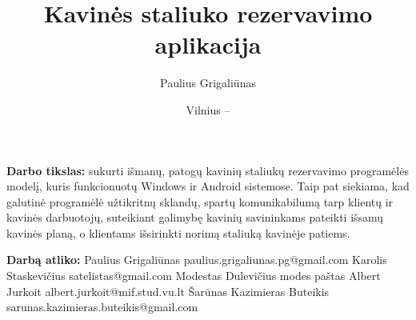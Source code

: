 \documentclass{VUMIFPSkursinis}
\title{Kavinės staliuko rezervavimo aplikacija}
\author{Paulius Grigaliūnas}
\date{Vilnius – \the\year}
\begin{document}
	
\maketitle
\cleardoublepage{}
\setcounter{page}{2}



{\bfseries Darbo tikslas:} sukurti išmanų, patogų kavinių staliukų rezervavimo programėlės modelį, kuris funkcionuotų Windows ir Android sistemose. Taip pat siekiama, kad galutinė programėlė užtikritnų sklandų, spartų komunikabilumą tarp klientų ir kavinės darbuotojų, suteikiant galimybę kavinių savininkams pateikti išsamų kavinės planą, o klientams išsirinkti norimą staliuką kavinėje patiems. 
\newline
\newline
\newline


{\bfseries Darbą atliko:}
\newline
\newline
\newline
Paulius Grigaliūnas
\newline
paulius.grigaliunas.pg@gmail.com
\newline
\newline
\newline
Karolis Staskevičius
\newline
satelistas@gmail.com
\newline
\newline
\newline
Modestas Dulevičius
\newline
modes paštas
\newline
\newline
\newline
Albert Jurkoit
\newline
albert.jurkoit@mif.stud.vu.lt
\newline
\newline
\newline
Šarūnas Kazimieras Buteikis
\newline
sarunas.kazimieras.buteikis@gmail.com


\tableofcontents

\end{document}
